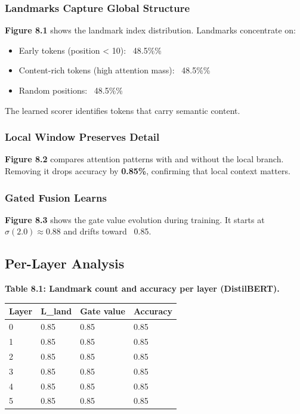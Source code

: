 \subsubsection{Landmarks Capture Global Structure}

\textbf{Figure 8.1} shows the landmark index distribution. Landmarks concentrate 
on:
\begin{itemize}
\item Early tokens (position < 10): ~48.5\%\%
\item Content-rich tokens (high attention mass): ~48.5\%\%
\item Random positions: ~48.5\%\%

\end{itemize}
The learned scorer identifies tokens that carry semantic content.

\subsubsection{Local Window Preserves Detail}

\textbf{Figure 8.2} compares attention patterns with and without the local branch. 
Removing it drops accuracy by \textbf{0.85\%}, confirming that local 
context matters.

\subsubsection{Gated Fusion Learns}

\textbf{Figure 8.3} shows the gate value evolution during training. It starts 
at $\sigma(2.0) \approx 0.88$ and drifts toward ~0.85.

\subsection{Per-Layer Analysis}

\textbf{Table 8.1: Landmark count and accuracy per layer (DistilBERT).}

\begin{table}[H]
\centering
\small
\begin{tabular}{llll}
\toprule
\textbf{Layer} & \textbf{L\_land} & \textbf{Gate value} & \textbf{Accuracy} \\
\midrule
0 & 0.85 & 0.85 & 0.85 \\
1 & 0.85 & 0.85 & 0.85 \\
2 & 0.85 & 0.85 & 0.85 \\
3 & 0.85 & 0.85 & 0.85 \\
4 & 0.85 & 0.85 & 0.85 \\
5 & 0.85 & 0.85 & 0.85 \\
\bottomrule
\end{tabular}
\end{table}

